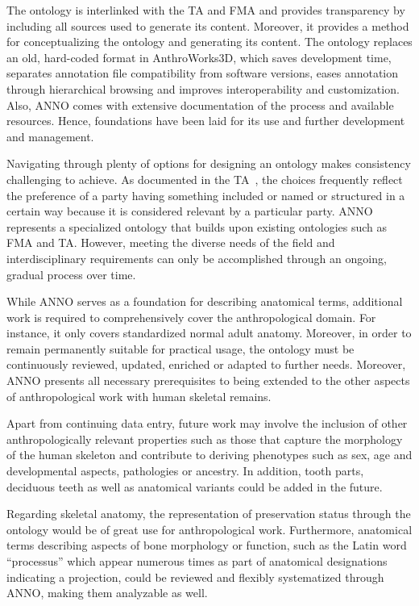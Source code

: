 \documentclass[sw]{iosart2x}
\newcommand{\aw}{AnthroWorks3D}
\begin{document}
The ontology is interlinked with the TA and FMA and provides transparency by including all sources used to generate its content.
Moreover, it provides a method for conceptualizing the ontology and generating its content.
The ontology replaces an old, hard-coded format in \aw{}, which saves development time, separates annotation file compatibility from software versions, eases annotation through hierarchical browsing and improves interoperability and customization.
Also, ANNO comes with extensive documentation of the process and available resources.
Hence, foundations have been laid for its use and further development and management.

Navigating through plenty of options for designing an ontology makes consistency challenging to achieve.
As documented in the TA~\citep[part II]{ta2}, the choices frequently reflect the preference of a party having something included or named or structured in a certain way because it is considered relevant by a particular party.
ANNO represents a specialized ontology that builds upon existing ontologies such as FMA and TA.
However, meeting the diverse needs of the field and interdisciplinary requirements can only be accomplished through an ongoing, gradual process over time.

While ANNO serves as a foundation for describing anatomical terms, additional work is required to comprehensively cover the anthropological domain.
For instance, it only covers standardized normal adult anatomy.
Moreover, in order to remain permanently suitable for practical usage, the ontology must be continuously reviewed, updated, enriched or adapted to further needs.
Moreover, ANNO presents all necessary prerequisites to being extended to the other aspects of anthropological work with human skeletal remains.

Apart from continuing data entry, future work may involve the inclusion of other anthropologically relevant properties such as those that capture the morphology of the human skeleton and contribute to deriving phenotypes such as sex, age and developmental aspects, pathologies or ancestry.
In addition, tooth parts, deciduous teeth as well as anatomical variants could be added in the future.

Regarding skeletal anatomy, the representation of preservation status through the ontology would be of great use for anthropological work.
Furthermore, anatomical terms describing aspects of bone morphology or function, such as the Latin word \enquote{processus} which appear numerous times as part of anatomical designations indicating a projection, could be reviewed and flexibly systematized through ANNO, making them analyzable as well.
\end{document}
